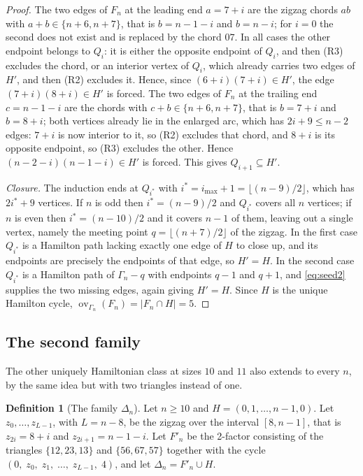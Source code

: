\documentclass[11pt,a4paper]{article}
\theoremstyle{definition}
\newtheorem{definition}[theorem]{Definition}
\theoremstyle{remark}
\newcommand{\ov}{\operatorname{ov}}
\begin{document}
\begin{proof}
The two edges of $F_n$ at the leading end $a=7+i$ are the zigzag chords $ab$ with $a+b\in\{n+6,n+7\}$, that is $b=n-1-i$ and $b=n-i$; for $i=0$ the second does not exist and is replaced by the chord $07$. In all cases the other endpoint belongs to $Q_i$: it is either the opposite endpoint of $Q_i$, and then (R3) excludes the chord, or an interior vertex of $Q_i$, which already carries two edges of $H'$, and then (R2) excludes it. Hence, since $(6+i)(7+i)\in H'$, the edge $(7+i)(8+i)\in H'$ is forced. The two edges of $F_n$ at the trailing end $c=n-1-i$ are the chords with $c+b\in\{n+6,n+7\}$, that is $b=7+i$ and $b=8+i$; both vertices already lie in the enlarged arc, which has $2i+9\le n-2$ edges: $7+i$ is now interior to it, so (R2) excludes that chord, and $8+i$ is its opposite endpoint, so (R3) excludes the other. Hence $(n-2-i)(n-1-i)\in H'$ is forced. This gives $Q_{i+1}\subseteq H'$.

\emph{Closure.} The induction ends at $Q_{i^*}$ with $i^*=i_{\max}+1=\lfloor (n-9)/2\rfloor$, which has $2i^*+9$ vertices. If $n$ is odd then $i^*=(n-9)/2$ and $Q_{i^*}$ covers all $n$ vertices; if $n$ is even then $i^*=(n-10)/2$ and it covers $n-1$ of them, leaving out a single vertex, namely the meeting point $q=\lfloor (n+7)/2\rfloor$ of the zigzag. In the first case $Q_{i^*}$ is a Hamilton path lacking exactly one edge of $H$ to close up, and its endpoints are precisely the endpoints of that edge, so $H'=H$. In the second case $Q_{i^*}$ is a Hamilton path of $\Gamma_n-q$ with endpoints $q-1$ and $q+1$, and \eqref{eq:seed2} supplies the two missing edges, again giving $H'=H$. Since $H$ is the unique Hamilton cycle, $\ov_{\Gamma_n}(F_n)=|F_n\cap H|=5$.
\end{proof}

\subsection{The second family}\label{sub:delta}

The other uniquely Hamiltonian class at sizes $10$ and $11$ also extends to every $n$, by the same idea but with two triangles instead of one.

\begin{definition}[The family $\Delta_n$]\label{def:delta}
Let $n\ge10$ and $H=(0,1,\dots,n-1,0)$. Let $z_0,\dots,z_{L-1}$, with $L=n-8$, be the zigzag over the interval $[8,n-1]$, that is $z_{2i}=8+i$ and $z_{2i+1}=n-1-i$. Let $F'_n$ be the 2-factor consisting of the triangles $\{12,23,13\}$ and $\{56,67,57\}$ together with the cycle $(0,\;z_0,\;z_1,\;\dots,\;z_{L-1},\;4)$, and let $\Delta_n=F'_n\cup H$.
\end{definition}
\end{document}
